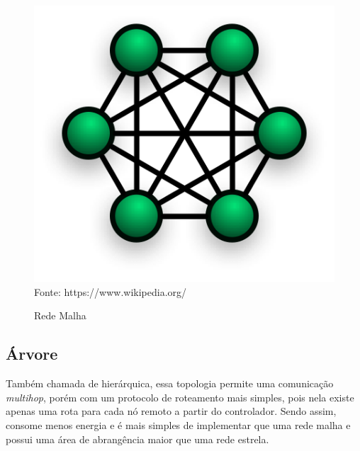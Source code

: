 \begin{figure}[h]
	\caption{Rede Malha}
	\centering
	\includegraphics[scale=0.3]{../images/mesh.png}
	\hspace{\linewidth}
	Fonte: https://www.wikipedia.org/
	\label{figura:mesh}
\end{figure}

\subsection{Árvore}
Também chamada de hierárquica, essa topologia permite uma comunicação \textit{multihop}, porém com um protocolo de
roteamento mais simples, pois nela existe apenas uma rota para cada nó remoto a partir do controlador. Sendo
assim, consome menos energia e é mais simples de implementar que uma rede malha e possui uma área de
abrangência maior que uma rede estrela.


